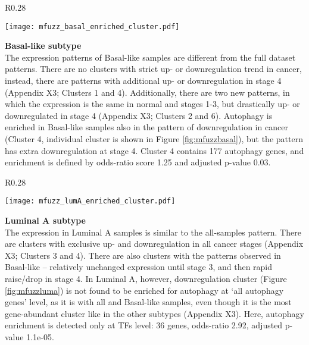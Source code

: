         
        \begin{wrapfigure}{R}{0.28\textwidth}
        \hfill
        \captionsetup{justification=centering}
        \centerline{ \texttt{[image: mfuzz\_basal\_enriched\_cluster.pdf]}}
        \vspace*{-8mm}
        \caption[Basal-like subtype downregulation cluster]{\label{fig:mfuzzbasal}Basal-like\newline downregulation cluster}
        \end{wrapfigure}

        
        \textbf{Basal-like subtype}\\
        The expression patterns of Basal-like samples are different from the full dataset patterns. There are no clusters with strict up- or downregulation trend in cancer, instead, there are patterns with additional up- or downregulation in stage 4 (Appendix X3; Clusters 1 and 4). Additionally, there are two new patterns, in which the expression is the same in normal and stages 1-3, but drastically up- or downregulated in stage 4 (Appendix X3; Clusters 2 and 6).  
        Autophagy is enriched in Basal-like samples also in the pattern of downregulation in cancer (Cluster 4, individual cluster is shown in Figure \ref{fig:mfuzzbasal}), but the pattern has extra downregulation at stage 4. Cluster 4 contains 177 autophagy genes, and enrichment is defined by odds-ratio score 1.25 and adjusted p-value 0.03. 
        
        
        \begin{wrapfigure}{R}{0.28\textwidth}
        \hfill
        \captionsetup{justification=centering}
        \centerline{ \texttt{[image: mfuzz\_lumA\_enriched\_cluster.pdf]}}
        \vspace*{-8mm}
        \caption[Luminal A subtype downregulation cluster]{\label{fig:mfuzzluma}Luminal A \newline downregulation cluster}
        \end{wrapfigure}
        
        
        \textbf{Luminal A subtype}\\   
        The expression in Luminal A samples is similar to the all-samples pattern. There are clusters with exclusive up- and downregulation in all cancer stages (Appendix X3; Clusters 3 and 4). There are also clusters with the patterns observed in Basal-like -- relatively unchanged expression until stage 3, and then rapid raise/drop in stage 4. In Luminal A, however, downregulation cluster (Figure \ref{fig:mfuzzluma}) is not found to be enriched for autophagy at ‘all autophagy genes' level, as it is with all and Basal-like samples, even though it is the most gene-abundant cluster like in the other subtypes (Appendix X3). Here, autophagy enrichment is detected only at TFs level: 36 genes, odds-ratio 2.92, adjusted p-value 1.1e-05.\vspace{5mm} \break
        

